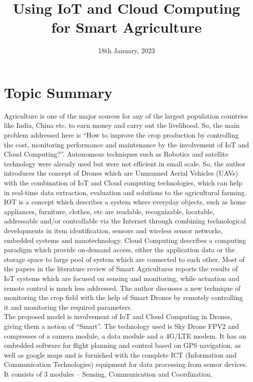 \documentclass{article}
\title{Using IoT and Cloud Computing for Smart Agriculture}
\author{}
\date{18th January, 2023}
\begin{document}
\maketitle

\section{Topic Summary} 
\begin{flushleft}
Agriculture is one of the major sources for any of the largest population countries like India, China etc. to earn money and carry out the livelihood. So, the main problem addressed here is “How to improve the crop production by controlling the cost, monitoring performance and maintenance by the involvement of IoT and Cloud Computing?”. Autonomous techniques such as Robotics and satellite technology were already used but were not efficient in small scale. So, the author introduces the concept of Drones which are Unmanned Aerial Vehicles (UAVs) with the combination of IoT and Cloud computing technologies, which can help in real-time data extraction, evaluation and solutions to the agricultural farming.\\
IOT is a concept which describes a system where everyday objects, such as home appliances, furniture, clothes, etc are readable, recognizable, locatable, addressable and/or controllable via the Internet through combining technological developments in item identification, sensors and wireless sensor networks, embedded systems and nanotechnology. Cloud Computing describes a computing paradigm which provide on-demand access, either the application data or the storage space to large pool of system which are connected to each other. Most of the papers in the literature review of Smart Agricultures reports the results of IoT systems which are focused on sensing and monitoring, while actuation and remote control is much less addressed. The author discusses a new technique of monitoring the crop field with the help of Smart Drones by remotely controlling it and monitoring the required parameters. \\
The proposed model is involvement of IoT and Cloud Computing in Drones, giving them a notion of “Smart”. The technology used is Sky Drone FPV2 and compresses of a camera module, a data module and a 4G/LTE modem. It has an embedded software for flight planning and control based on GPS navigation, as well as google maps and is furnished with the complete ICT (Information and Communication Technologies) equipment for data processing from sensor devices. It consists of 3 modules – Sensing, Communication and Coordination. \\

\end{flushleft}
\end{document}
